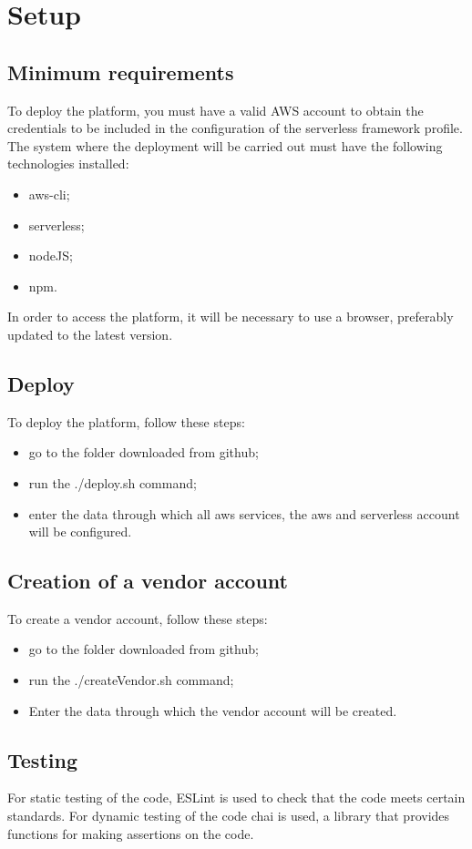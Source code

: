 \section{Setup}
\subsection{Minimum requirements}
To deploy the platform, you must have a valid AWS account to obtain the credentials to be included in the configuration of the serverless framework profile.\newline
The system where the deployment will be carried out must have the following technologies installed:
\begin{itemize}
    \item aws-cli;
    \item serverless;
    \item nodeJS;
    \item npm.
\end{itemize}
In order to access the platform, it will be necessary to use a browser, preferably updated to the latest version.
\subsection{Deploy}
To deploy the platform, follow these steps:
\begin{itemize}
    \item go to the folder downloaded from github;
    \item run the ./deploy.sh command;
    \item enter the data through which all aws services, the aws and serverless account will be configured.
\end{itemize}
\subsection{Creation of a vendor account}
To create a vendor account, follow these steps:
\begin{itemize}
    \item go to the folder downloaded from github;
    \item run the ./createVendor.sh command;
    \item Enter the data through which the vendor account will be created.
\end{itemize}
\subsection{Testing}
For static testing of the code, ESLint is used to check that the code meets certain standards.\newline
For dynamic testing of the code chai is used, a library that provides functions for making assertions on the code.